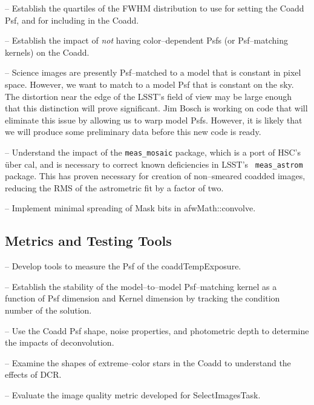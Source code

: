 \documentclass[12pt]{article}
\begin{document}
-- Establish the quartiles of the FWHM distribution to use for setting the Coadd Psf, 
and for including in the Coadd.

-- Establish the impact of {\it not} having color--dependent Psfs (or Psf--matching kernels) on the Coadd.

-- Science images are presently Psf--matched to a model that is constant in pixel space.
However, we want to match to a model Psf that is constant on the sky.  The
distortion near the edge of the LSST's field of view may be large enough
that this distinction will prove significant. Jim Bosch is working on code
that will eliminate this issue by allowing us to warp model Psfs.
However, it is likely that we will produce some preliminary data before this new code is ready.

-- Understand the impact of the {\tt meas\_mosaic} package, which is a port of HSC's \"{u}ber
cal, and is necessary to correct known deficiencies in LSST's {\tt
  meas\_astrom} package.  This has proven necessary for creation of
non--smeared coadded images, reducing the RMS of the astrometric fit
by a factor of two.  

-- Implement minimal spreading of Mask bits in afwMath::convolve.

%
%
%
%
%

\subsection{Metrics and Testing Tools}

-- Develop tools to measure the Psf of the coaddTempExposure.

-- Establish the stability of the model--to--model Psf--matching
kernel as a function of Psf dimension and Kernel dimension by tracking
the condition number of the solution.

-- Use the Coadd Psf shape, noise properties, and photometric depth 
to determine the impacts of deconvolution.

-- Examine the shapes of extreme--color stars in the Coadd to understand the effects of DCR.

-- Evaluate the image quality metric developed for SelectImagesTask.

\end{document}
